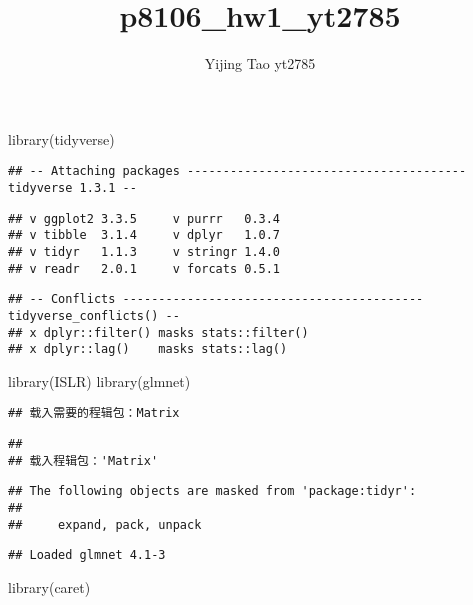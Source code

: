 \documentclass[
]{article}
\title{p8106\_hw1\_yt2785}
\author{Yijing Tao yt2785}
\date{}
\newenvironment{Shaded}{\begin{snugshade}}{\end{snugshade}}
\newcommand{\FunctionTok}[1]{\textcolor[rgb]{0.00,0.00,0.00}{#1}}
\newcommand{\NormalTok}[1]{#1}
\begin{document}
\maketitle

{
\setcounter{tocdepth}{2}
\tableofcontents
}
\begin{Shaded}
\begin{Highlighting}[]
\FunctionTok{library}\NormalTok{(tidyverse)}
\end{Highlighting}
\end{Shaded}

\begin{verbatim}
## -- Attaching packages --------------------------------------- tidyverse 1.3.1 --
\end{verbatim}

\begin{verbatim}
## v ggplot2 3.3.5     v purrr   0.3.4
## v tibble  3.1.4     v dplyr   1.0.7
## v tidyr   1.1.3     v stringr 1.4.0
## v readr   2.0.1     v forcats 0.5.1
\end{verbatim}

\begin{verbatim}
## -- Conflicts ------------------------------------------ tidyverse_conflicts() --
## x dplyr::filter() masks stats::filter()
## x dplyr::lag()    masks stats::lag()
\end{verbatim}

\begin{Shaded}
\begin{Highlighting}[]
\FunctionTok{library}\NormalTok{(ISLR)}
\FunctionTok{library}\NormalTok{(glmnet)}
\end{Highlighting}
\end{Shaded}

\begin{verbatim}
## 载入需要的程辑包：Matrix
\end{verbatim}

\begin{verbatim}
## 
## 载入程辑包：'Matrix'
\end{verbatim}

\begin{verbatim}
## The following objects are masked from 'package:tidyr':
## 
##     expand, pack, unpack
\end{verbatim}

\begin{verbatim}
## Loaded glmnet 4.1-3
\end{verbatim}

\begin{Shaded}
\begin{Highlighting}[]
\FunctionTok{library}\NormalTok{(caret)}
\end{Highlighting}
\end{Shaded}
\end{document}
